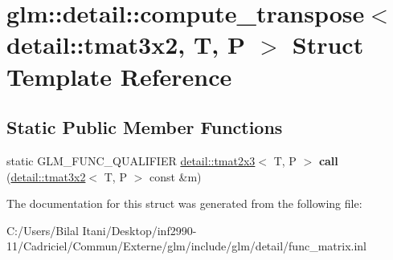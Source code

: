 \hypertarget{structglm_1_1detail_1_1compute__transpose_3_01detail_1_1tmat3x2_00_01_t_00_01_p_01_4}{}\section{glm\+:\+:detail\+:\+:compute\+\_\+transpose$<$ detail\+:\+:tmat3x2, T, P $>$ Struct Template Reference}
\label{structglm_1_1detail_1_1compute__transpose_3_01detail_1_1tmat3x2_00_01_t_00_01_p_01_4}
\subsection*{Static Public Member Functions}
\begin{DoxyCompactItemize}
\item 
static G\+L\+M\+\_\+\+F\+U\+N\+C\+\_\+\+Q\+U\+A\+L\+I\+F\+I\+ER \hyperlink{structglm_1_1detail_1_1tmat2x3}{detail\+::tmat2x3}$<$ T, P $>$ {\bfseries call} (\hyperlink{structglm_1_1detail_1_1tmat3x2}{detail\+::tmat3x2}$<$ T, P $>$ const \&m)\hypertarget{structglm_1_1detail_1_1compute__transpose_3_01detail_1_1tmat3x2_00_01_t_00_01_p_01_4_a0a30f21e987d479af32a28eb6aeb5def}{}\label{structglm_1_1detail_1_1compute__transpose_3_01detail_1_1tmat3x2_00_01_t_00_01_p_01_4_a0a30f21e987d479af32a28eb6aeb5def}

\end{DoxyCompactItemize}


The documentation for this struct was generated from the following file\+:\begin{DoxyCompactItemize}
\item 
C\+:/\+Users/\+Bilal Itani/\+Desktop/inf2990-\/11/\+Cadriciel/\+Commun/\+Externe/glm/include/glm/detail/func\+\_\+matrix.\+inl\end{DoxyCompactItemize}
